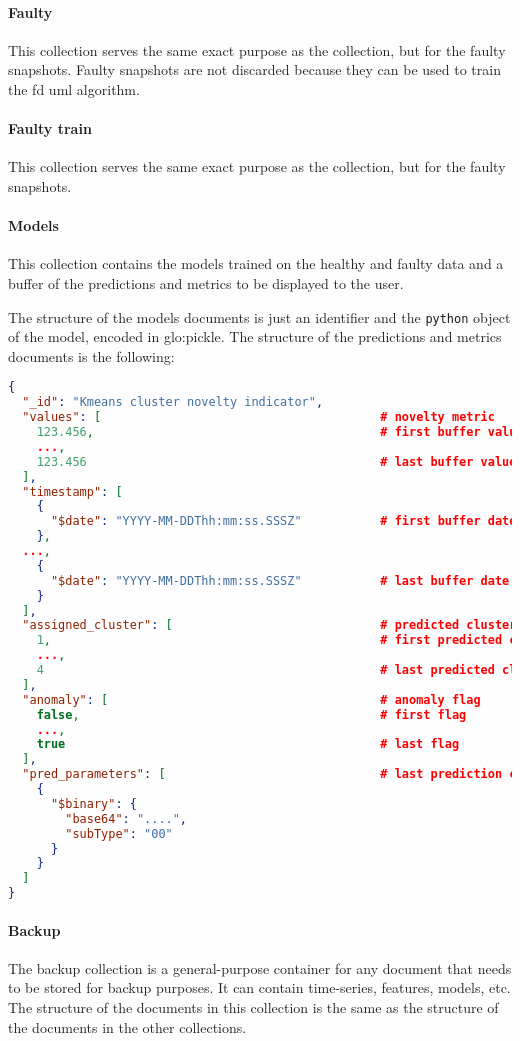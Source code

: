 \paragraph{Faulty}
This collection serves the same exact purpose as the  collection, but for the faulty snapshots. Faulty snapshots are not discarded because they can be used to train the \gls{fd} \gls{uml} algorithm.

\paragraph{Faulty train}
This collection serves the same exact purpose as the  collection, but for the faulty snapshots.

\paragraph{Models}
This collection contains the models trained on the healthy and faulty data and a buffer of the predictions and metrics to be displayed to the user.

The structure of the models documents is just an identifier and the \texttt{python} object of the model, encoded in \gls{glo:pickle}. The structure of the predictions and metrics documents is the following:

\begin{lstlisting}[language=json,firstnumber=1]
{
  "_id": "Kmeans cluster novelty indicator",
  "values": [										# novelty metric
    123.456,										# first buffer value
    ...,
    123.456									        # last buffer value
  ],
  "timestamp": [
    {
      "$date": "YYYY-MM-DDThh:mm:ss.SSSZ"			# first buffer date
    },
  ...,
    {
      "$date": "YYYY-MM-DDThh:mm:ss.SSSZ"			# last buffer date
    }
  ],
  "assigned_cluster": [								# predicted cluster
    1,												# first predicted cluster
    ...,
    4												# last predicted cluster
  ],
  "anomaly": [										# anomaly flag
    false,											# first flag
    ...,
    true											# last flag
  ],
  "pred_parameters": [								# last prediction curve 
    {
      "$binary": {
        "base64": "....",
        "subType": "00"
      }
    }
  ]
}
\end{lstlisting}

\paragraph{Backup}
The backup collection is a general-purpose container for any document that needs to be stored for backup purposes. It can contain time-series, features, models, etc. The structure of the documents in this collection is the same as the structure of the documents in the other collections.

